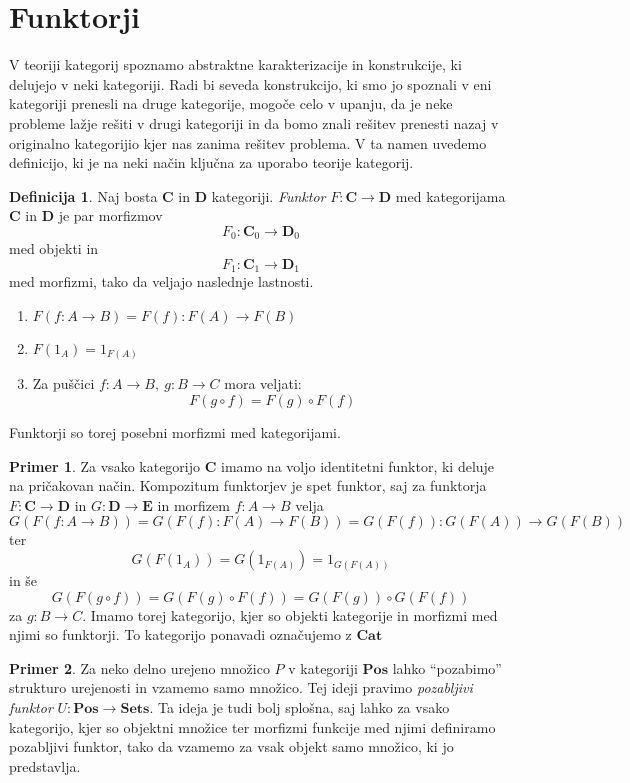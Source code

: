 \documentclass[12pt,a4paper]{book}
\theoremstyle{definition}
\newtheorem{definicija}{Definicija}[chapter]
\theoremstyle{plain}
\theoremstyle{definition}
\newtheorem{primer}{Primer}[section]
\theoremstyle{remark}
\newcommand{\cat}[1]{\textbf{#1}}
\begin{document}
\section{Funktorji}

V teoriji kategorij spoznamo abstraktne karakterizacije in konstrukcije, ki delujejo v neki kategoriji. Radi bi seveda konstrukcijo, ki smo jo spoznali v eni kategoriji prenesli na druge kategorije, mogoče celo v upanju, da je neke probleme lažje rešiti v drugi kategoriji in da bomo znali rešitev prenesti nazaj v originalno kategorijio kjer nas zanima rešitev problema. V ta namen uvedemo definicijo, ki je na neki način ključna za uporabo teorije kategorij.

\begin{definicija}
Naj bosta $\cat{C}$ in $\cat{D}$ kategoriji. \emph{Funktor} $F : \cat{C} \to \cat{D}$ med kategorijama $\cat{C}$ in $\cat{D}$ je par morfizmov
$$F_0 : \cat{C}_0 \to \cat{D}_0$$
med objekti in
$$F_1 : \cat{C}_1 \to \cat{D}_1$$
med morfizmi, tako da veljajo naslednje lastnosti.
\begin{enumerate}
\item $F(f : A \to B) = F(f) : F(A) \to F(B)$
\item $F(1_A) = 1_{F(A)}$
\item Za puščici $f : A \to B, \ g : B \to C$ mora veljati:
$$F(g \circ f) = F(g) \circ F(f)$$
\end{enumerate}
\end{definicija}

Funktorji so torej posebni morfizmi med kategorijami.

\begin{primer}
Za vsako kategorijo $\cat{C}$ imamo na voljo identitetni funktor, ki deluje na pričakovan način. Kompozitum funktorjev je spet funktor, saj za funktorja $F : \cat{C} \to \cat{D}$ in $G : \cat{D} \to \cat{E}$ in morfizem $f : A \to B$ velja
$$G(F(f : A \to B)) = G(F(f) : F(A) \to F(B)) = G(F(f)) : G(F(A)) \to G(F(B))$$
ter
$$G(F(1_A)) = G(1_{F(A)}) = 1_{G(F(A))}$$
in še
$$G(F(g \circ f)) = G(F(g) \circ F(f)) = G(F(g)) \circ G(F(f))$$
za $g : B \to C$. Imamo torej kategorijo, kjer so objekti kategorije in morfizmi med njimi so funktorji. To kategorijo ponavadi označujemo z $\cat{Cat}$ 
\end{primer}

\begin{primer}
Za neko delno urejeno množico $P$ v kategoriji $\cat{Pos}$ lahko "`pozabimo"' strukturo urejenosti in vzamemo samo množico. Tej ideji pravimo \emph{pozabljivi funktor} $U : \cat{Pos} \to \cat{Sets}$. Ta ideja je tudi bolj splošna, saj lahko za vsako kategorijo, kjer so objektni množice ter morfizmi funkcije med njimi definiramo pozabljivi funktor, tako da vzamemo za vsak objekt samo množico, ki jo predstavlja.
\end{primer}
\end{document}
